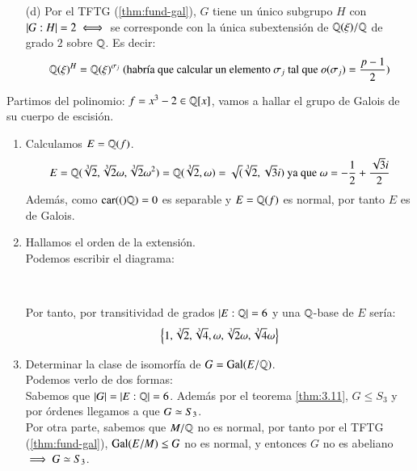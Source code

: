 \begin{ex}[H4.7]
\begin{itemize}
        \item[(d)]  Por el TFTG (\ref{thm:fund-gal}), $G$ tiene un único subgrupo $H$ con $\left|G:H\right| = 2 \iff $ se corresponde con la única subextensión de $\mathbb{Q}(\xi) / \mathbb{Q}$ de grado $2$ sobre $\mathbb{Q}$. Es decir:
        $$
            \mathbb{Q}(\xi)^H = \mathbb{Q}(\xi)^{\sigma_j} \text{ (habría que calcular un elemento $\sigma_j$ tal que $o(\sigma_j) = \frac{p-1}{2}$)}
        $$
    \end{itemize}
\end{ex}


\begin{eg}
    Partimos del polinomio: $f = x^3 - 2 \in \mathbb{Q}[x]$, vamos a hallar el grupo de Galois de su cuerpo de escisión.
    \begin{enumerate}
        \item Calculamos $E = \mathbb{Q}(f)$.
        $$
            E = \mathbb{Q}(\sqrt[3]{2}, \sqrt[3]{2} \omega, \sqrt[3]{2} \omega^2) = \mathbb{Q}(\sqrt[3]{2}, \omega) = \sqrt(\sqrt[3]{2}, \sqrt{3} i) \text{ ya que } \omega = -\frac{1}{2} + \frac{\sqrt{3}i}{2}
        $$
        Además, como $\mathrm{car}(()\mathbb{Q}) = 0$ es separable y $E = \mathbb{Q}(f)$ es normal, por tanto $E$ es de Galois.
        \item Hallamos el orden de la extensión.\\
        Podemos escribir el diagrama:\\
        \begin{center}
            \\
        \end{center}
        Por tanto, por transitividad de grados $\left|E:\mathbb{Q}\right| = 6$ y una $\mathbb{Q}$-base de $E$ sería:
        $$
            \left\{1, \sqrt[3]{2}, \sqrt[3]{4}, \omega, \sqrt[3]{2}\omega, \sqrt[3]{4}\omega\right\}
        $$
        \item Determinar la clase de isomorfía de $G = \mathrm{Gal}(E/\mathbb{Q})$.\\
        Podemos verlo de dos formas:\\
        Sabemos que $\left|G\right| = \left|E:\mathbb{Q}\right| = 6$. Además por el teorema \ref{thm:3.11}, $G \leq S_3$ y por órdenes llegamos a que $G \simeq S_3$.\\ %
        Por otra parte, sabemos que $M/\mathbb{Q}$ no es normal, por tanto por el TFTG (\ref{thm:fund-gal}), $\mathrm{Gal}(E/M) \leq G$ no es normal, y entonces $G$ no es abeliano $\implies G \simeq S_3$.


\end{enumerate}
\end{eg}
